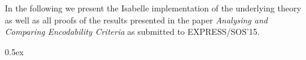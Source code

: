 \documentclass[11pt,a4paper]{article}
\begin{document}
\noindent
In the following we present the Isabelle implementation of the underlying theory as well as all proofs of the results presented in the paper \emph{Analysing and Comparing Encodability Criteria} as submitted to EXPRESS/SOS'15.

\newpage
\tableofcontents
\newpage

\parindent 0pt\parskip 0.5ex



%
%
\end{document}
